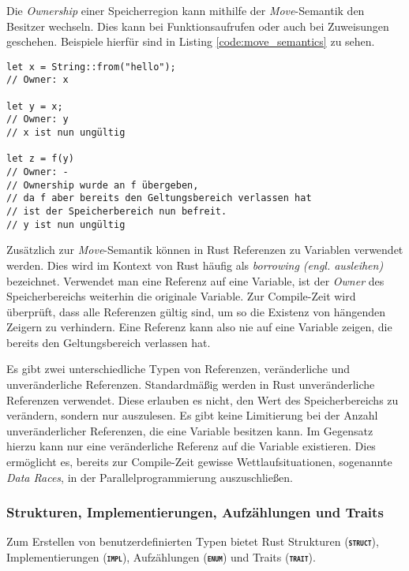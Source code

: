 Die \textit{Ownership} einer Speicherregion kann mithilfe der \textit{Move}-Semantik den Besitzer wechseln.
Dies kann bei Funktionsaufrufen oder auch bei Zuweisungen geschehen. Beispiele hierfür sind in Listing
\ref{code:move_semantics} zu sehen.\cite{rustBook}

\begin{lstlisting}[float,caption={Beispieldarstellung der \textit{Move}-Semantik},label=code:move_semantics]
let x = String::from("hello");
// Owner: x

let y = x;
// Owner: y
// x ist nun ungültig

let z = f(y) 
// Owner: -
// Ownership wurde an f übergeben,
// da f aber bereits den Geltungsbereich verlassen hat
// ist der Speicherbereich nun befreit.
// y ist nun ungültig
\end{lstlisting}

Zusätzlich zur \textit{Move}-Semantik können in Rust Referenzen zu Variablen verwendet werden. Dies wird im Kontext
von Rust häufig als \textit{borrowing (engl. ausleihen)} bezeichnet. Verwendet man eine Referenz auf eine Variable,
ist der \textit{Owner} des Speicherbereichs weiterhin die originale Variable.
Zur Compile-Zeit wird überprüft, dass alle Referenzen gültig sind, um so die Existenz von hängenden Zeigern
zu verhindern. Eine Referenz kann also nie auf eine Variable zeigen, die bereits den Geltungsbereich verlassen hat.
\cite{rustBook}

Es gibt zwei unterschiedliche
Typen von Referenzen, veränderliche und unveränderliche Referenzen. Standardmäßig werden in Rust unveränderliche
Referenzen verwendet. Diese erlauben es nicht, den Wert des Speicherbereichs zu verändern, sondern nur auszulesen.
Es gibt keine Limitierung bei der Anzahl unveränderlicher Referenzen, die eine Variable besitzen kann. Im Gegensatz
hierzu kann nur eine veränderliche Referenz auf die Variable existieren. Dies ermöglicht es, bereits zur
Compile-Zeit gewisse Wettlaufsituationen, sogenannte \textit{Data Races},
in der Parallelprogrammierung auszuschließen.\cite{rustBook}

\subsubsection{Strukturen, Implementierungen, Aufzählungen und Traits}

Zum Erstellen von benutzerdefinierten Typen bietet Rust Strukturen (\texttt{\textsc{\textbf{struct}}}),
Implementierungen (\texttt{\textsc{\textbf{impl}}}), Aufzählungen (\texttt{\textsc{\textbf{enum}}}) und
Traits (\texttt{\textsc{\textbf{trait}}}).

